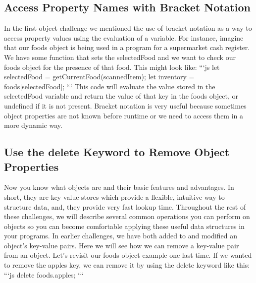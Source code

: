 \documentclass{article}%
\begin{document}
%
\subsection{Access Property Names with Bracket Notation}%
\label{subsec:AccessPropertyNameswithBracketNotation}%
In the first object challenge we mentioned the use of bracket notation as a way to access property values using the evaluation of a variable. For instance, imagine that our foods object is being used in a program for a supermarket cash register. We have some function that sets the selectedFood and we want to check our foods object for the presence of that food. This might look like:\newline%
```js\newline%
let selectedFood = getCurrentFood(scannedItem);\newline%
let inventory = foods{[}selectedFood{]};\newline%
```\newline%
This code will evaluate the value stored in the selectedFood variable and return the value of that key in the foods object, or undefined if it is not present. Bracket notation is very useful because sometimes object properties are not known before runtime or we need to access them in a more dynamic way.\newline%

%
\subsection{Use the delete Keyword to Remove Object Properties}%
\label{subsec:UsethedeleteKeywordtoRemoveObjectProperties}%
Now you know what objects are and their basic features and advantages. In short, they are key{-}value stores which provide a flexible, intuitive way to structure data, and, they provide very fast lookup time. Throughout the rest of these challenges, we will describe several common operations you can perform on objects so you can become comfortable applying these useful data structures in your programs.\newline%
In earlier challenges, we have both added to and modified an object's key{-}value pairs. Here we will see how we can remove a key{-}value pair from an object.\newline%
Let's revisit our foods object example one last time. If we wanted to remove the apples key, we can remove it by using the delete keyword like this:\newline%
```js\newline%
delete foods.apples;\newline%
```\newline%
\end{document}
